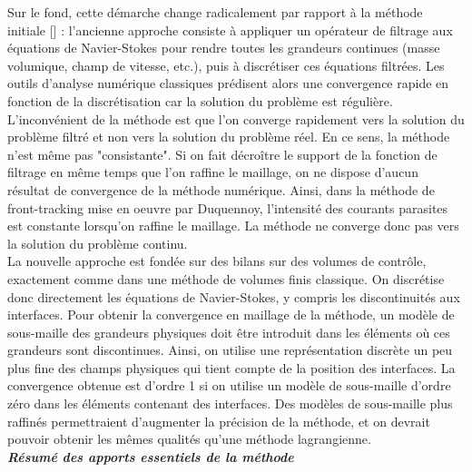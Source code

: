 Sur le fond, cette d\'emarche change radicalement par rapport à la m\'ethode initiale [\cite{Unverdi1992}] : l’ancienne approche consiste \`a appliquer un op\'erateur de filtrage aux \'equations de Navier-Stokes pour rendre toutes les grandeurs continues (masse volumique, champ de vitesse, etc.), puis \`a discr\'etiser ces \'equations filtr\'ees. Les outils d’analyse num\'erique classiques pr\'edisent alors une convergence rapide en fonction de la discr\'etisation car la solution du problème est r\'egulière.\\ L’inconv\'enient de la m\'ethode est que l’on converge rapidement vers la solution du problème filtr\'e et non vers la solution du problème r\'eel. En ce sens, la m\'ethode n’est m\^eme pas "consistante". Si on fait d\'ecroître le support de la fonction de filtrage en m\^eme temps que l’on raffine le maillage, on ne dispose d’aucun r\'esultat de convergence de la m\'ethode num\'erique. Ainsi, dans la m\'ethode de front-tracking mise en oeuvre par Duquennoy, l’intensit\'e des courants parasites est constante lorsqu’on raffine le maillage. La m\'ethode ne converge donc pas vers la solution du probl\`eme continu.\\
La nouvelle approche est fond\'ee sur des bilans sur des volumes de contr\^ole, exactement comme dans une m\'ethode de volumes finis classique. On discr\'etise donc directement les \'equations de Navier-Stokes, y compris les discontinuit\'es aux interfaces. Pour obtenir la convergence en maillage de la m\'ethode, un mod\`ele de sous-maille des grandeurs physiques doit \^etre introduit dans les \'el\'ements o\`u ces grandeurs sont discontinues. Ainsi, on utilise une repr\'esentation discr\`ete un peu plus fine des champs physiques qui tient compte de la position des interfaces. La convergence obtenue est d’ordre 1 si on utilise un modèle de sous-maille d’ordre z\'ero dans les \'el\'ements contenant des interfaces. Des mod\`eles de sous-maille plus raffin\'es permettraient d’augmenter la pr\'ecision de la m\'ethode, et on devrait pouvoir obtenir les m\^emes qualit\'es qu’une m\'ethode lagrangienne.\smallskip \\

\textit{\textbf{R\'esum\'e des apports essentiels de la m\'ethode}}\smallskip \\

